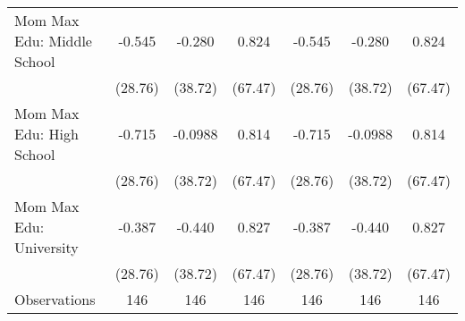 {\begin{tabular}{l*{6}{c}}
\addlinespace
Mom Max Edu: Middle School&      -0.545         &      -0.280         &       0.824         &      -0.545         &      -0.280         &       0.824         \\
                    &     (28.76)         &     (38.72)         &     (67.47)         &     (28.76)         &     (38.72)         &     (67.47)         \\
\addlinespace
Mom Max Edu: High School&      -0.715         &     -0.0988         &       0.814         &      -0.715         &     -0.0988         &       0.814         \\
                    &     (28.76)         &     (38.72)         &     (67.47)         &     (28.76)         &     (38.72)         &     (67.47)         \\
\addlinespace
Mom Max Edu: University&      -0.387         &      -0.440         &       0.827         &      -0.387         &      -0.440         &       0.827         \\
                    &     (28.76)         &     (38.72)         &     (67.47)         &     (28.76)         &     (38.72)         &     (67.47)         \\
\midrule
Observations        &         146         &         146         &         146         &         146         &         146         &         146         \\
\bottomrule
\end{tabular}
}
